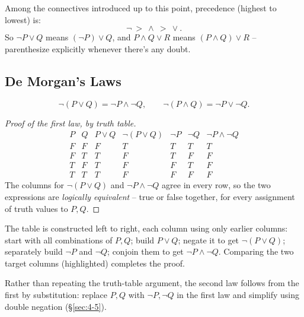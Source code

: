 \documentclass[11pt]{article}
\begin{document}
\begin{note}
Among the connectives introduced up to this point, precedence (highest to lowest) is:
\[
\neg \ > \ \wedge \ > \ \vee.
\]
So $\neg P \vee Q$ means $(\neg P) \vee Q$, and $P \wedge Q \vee R$ means $(P \wedge Q) \vee R$ -- parenthesize explicitly whenever there's any doubt.
\end{note}

\subsection{De Morgan's Laws}
\label{sec:4-8}

\begin{theorem}
\[
\neg(P \vee Q) = \neg P \wedge \neg Q, \qquad \neg(P \wedge Q) = \neg P \vee \neg Q.
\]
\end{theorem}

\bigskip
\begin{proof}[Proof of the first law, by truth table]
\[
\begin{array}{cc|c|c|cc|c}
P & Q & P\vee Q & \neg(P\vee Q) & \neg P & \neg Q & \neg P \wedge \neg Q \\ \hline
F & F & F & T & T & T & T \\
F & T & T & F & T & F & F \\
T & F & T & F & F & T & F \\
T & T & T & F & F & F & F
\end{array}
\]
The columns for $\neg(P\vee Q)$ and $\neg P \wedge \neg Q$ agree in every row, so the two expressions are \emph{logically equivalent} -- true or false together, for every assignment of truth values to $P,Q$.
\end{proof}

\bigskip
\begin{note}
The table is constructed left to right, each column using only earlier columns: start with all combinations of $P,Q$; build $P\vee Q$; negate it to get $\neg(P\vee Q)$; separately build $\neg P$ and $\neg Q$; conjoin them to get $\neg P \wedge \neg Q$. Comparing the two target columns (highlighted) completes the proof.
\end{note}

\bigskip
\begin{note}
Rather than repeating the truth-table argument, the second law follows from the first by substitution: replace $P,Q$ with $\neg P, \neg Q$ in the first law and simplify using double negation (\S\ref{sec:4-5}).
\end{note}
\end{document}
